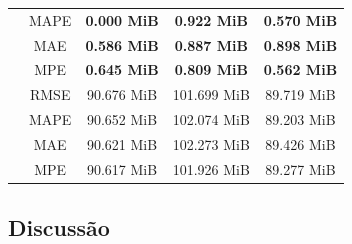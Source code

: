 \begin{table}[!htp]
\begin{tabular}{|c|c|ccc|}
        \rowcolor[HTML]{EFEFEF}
        \cellcolor[HTML]{C0C0C0}                          & MAPE                                              & \multicolumn{1}{c|}{\cellcolor[HTML]{EFEFEF}\textbf{0.000 MiB}} & \multicolumn{1}{c|}{\cellcolor[HTML]{EFEFEF}\textbf{0.922 MiB}} & \textbf{0.570 MiB} \\ \cline{2-5}
        \cellcolor[HTML]{C0C0C0}                          & MAE                                               & \multicolumn{1}{c|}{\textbf{0.586 MiB}}                         & \multicolumn{1}{c|}{\textbf{0.887 MiB}}                         & \textbf{0.898 MiB} \\ \cline{2-5}
        \rowcolor[HTML]{EFEFEF}
        \multirow{-4}{*}{\cellcolor[HTML]{C0C0C0}ReW}     & MPE                                               & \multicolumn{1}{c|}{\cellcolor[HTML]{EFEFEF}\textbf{0.645 MiB}} & \multicolumn{1}{c|}{\cellcolor[HTML]{EFEFEF}\textbf{0.809 MiB}} & \textbf{0.562 MiB} \\ \hline
        \cellcolor[HTML]{C0C0C0}                          & RMSE                                              & \multicolumn{1}{c|}{90.676 MiB}                                 & \multicolumn{1}{c|}{101.699 MiB}                                & 89.719 MiB         \\ \cline{2-5}
        \rowcolor[HTML]{EFEFEF}
        \cellcolor[HTML]{C0C0C0}                          & MAPE                                              & \multicolumn{1}{c|}{\cellcolor[HTML]{EFEFEF}90.652 MiB}         & \multicolumn{1}{c|}{\cellcolor[HTML]{EFEFEF}102.074 MiB}        & 89.203 MiB         \\ \cline{2-5}
        \cellcolor[HTML]{C0C0C0}                          & MAE                                               & \multicolumn{1}{c|}{90.621 MiB}                                 & \multicolumn{1}{c|}{102.273 MiB}                                & 89.426 MiB         \\ \cline{2-5}
        \rowcolor[HTML]{EFEFEF}
        \multirow{-4}{*}{\cellcolor[HTML]{C0C0C0}Prophet} & MPE                                               & \multicolumn{1}{c|}{\cellcolor[HTML]{EFEFEF}90.617 MiB}         & \multicolumn{1}{c|}{\cellcolor[HTML]{EFEFEF}101.926 MiB}        & 89.277 MiB         \\ \hline
    \end{tabular}
\end{table}

\FloatBarrier

\subsection{Discussão}
